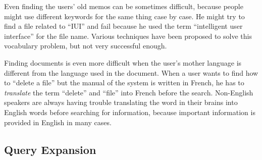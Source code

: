 \documentclass[manuscript,anonymous,review]{acmart}
\begin{document}
Even finding the users' old memos can be sometimes difficult,
because people might use different keywords for the same thing case by case.
He might try to find a file related to ``IUI'' and fail because he used
the term ``intelligent user interface'' for the file name.
%
Various techniques have been proposed to solve this vocabulary problem\cite{Furnas:1987:VPH:32206.32212},
but not very successful enough.


Finding documents is even more difficult when
the user's mother language is different from the language used in the document.
When a user wants to find how to ``delete a file'' but the
manual of the system is written in French,
he has to \textit{translate} the term ``delete'' and ``file'' into French
before the search.
Non-English speakers are always having trouble
translating the word in their brains into English words
before searching for information, because important information is
provided in English in many cases.


\subsection*{Query Expansion}

% 
%
\end{document}
